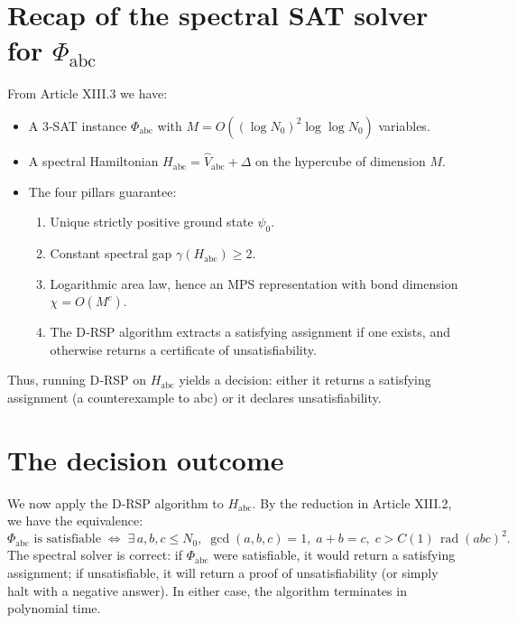 \documentclass[11pt,a4paper]{article}
\begin{document}
\section{Recap of the spectral SAT solver for $\Phi_{\text{abc}}$}

From Article XIII.3 we have:
\begin{itemize}
\item A 3‑SAT instance $\Phi_{\text{abc}}$ with $M = O((\log N_0)^2 \log \log N_0)$ variables.
\item A spectral Hamiltonian $H_{\text{abc}} = \hat{V}_{\text{abc}} + \Delta$ on the hypercube of dimension $M$.
\item The four pillars guarantee:
  \begin{enumerate}
  \item Unique strictly positive ground state $\psi_0$.
  \item Constant spectral gap $\gamma(H_{\text{abc}}) \ge 2$.
  \item Logarithmic area law, hence an MPS representation with bond dimension $\chi = O(M^c)$.
  \item The D‑RSP algorithm extracts a satisfying assignment if one exists, and otherwise returns a certificate of unsatisfiability.
  \end{enumerate}
\end{itemize}
Thus, running D‑RSP on $H_{\text{abc}}$ yields a decision: either it returns a satisfying assignment (a counterexample to abc) or it declares unsatisfiability.

\section{The decision outcome}

We now apply the D‑RSP algorithm to $H_{\text{abc}}$. By the reduction in Article XIII.2, we have the equivalence:
\[
\Phi_{\text{abc}} \text{ is satisfiable} \;\Longleftrightarrow\; \exists\, a,b,c \le N_0,\; \gcd(a,b,c)=1,\; a+b=c,\; c > C(1)\,\operatorname{rad}(abc)^{2}.
\]
The spectral solver is correct: if $\Phi_{\text{abc}}$ were satisfiable, it would return a satisfying assignment; if unsatisfiable, it will return a proof of unsatisfiability (or simply halt with a negative answer). In either case, the algorithm terminates in polynomial time.
\end{document}
